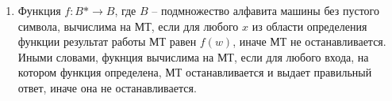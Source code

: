 \documentclass[a4paper,12pt]{article}
\begin{document}
\begin{enumerate}
   \item Функция $f: B* \rightarrow B$, где $B$ -- подмножество алфавита машины без пустого символа, вычислима на МТ, если для любого $x$ из области определения функции результат работы МТ равен $f(w)$, иначе МТ не останавливается. Иными словами, фукнция вычислима на МТ, если для любого входа, на котором функция определена, МТ останавливается и выдает правильный ответ, иначе она не останавливается.	
   
   
\end{enumerate}
		
	
\end{document}
